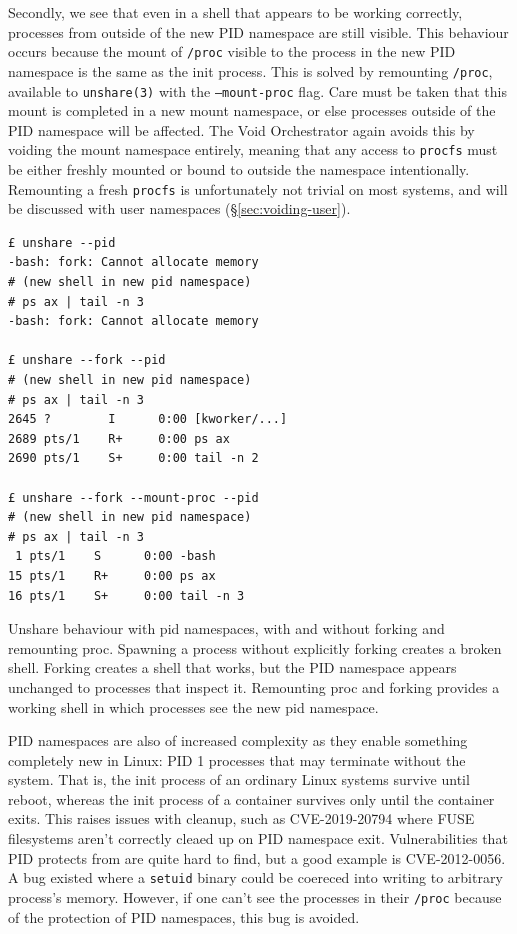 \documentclass[12pt,a4paper,twoside]{report}
\begin{document}
Secondly, we see that even in a shell that appears to be working correctly, processes from outside of the new PID namespace are still visible. This behaviour occurs because the mount of \texttt{/proc} visible to the process in the new PID namespace is the same as the init process. This is solved by remounting \texttt{/proc}, available to \texttt{unshare(3)} with the \texttt{---mount-proc} flag. Care must be taken that this mount is completed in a new mount namespace, or else processes outside of the PID namespace will be affected. The Void Orchestrator again avoids this by voiding the mount namespace entirely, meaning that any access to \texttt{procfs} must be either freshly mounted or bound to outside the namespace intentionally. Remounting a fresh \texttt{procfs} is unfortunately not trivial on most systems, and will be discussed with user namespaces (§\ref{sec:voiding-user}).

\begin{listing}
\begin{verbatim}
£ unshare --pid
-bash: fork: Cannot allocate memory
# (new shell in new pid namespace)
# ps ax | tail -n 3
-bash: fork: Cannot allocate memory

£ unshare --fork --pid
# (new shell in new pid namespace)
# ps ax | tail -n 3
2645 ?        I      0:00 [kworker/...]
2689 pts/1    R+     0:00 ps ax
2690 pts/1    S+     0:00 tail -n 2

£ unshare --fork --mount-proc --pid
# (new shell in new pid namespace)
# ps ax | tail -n 3
 1 pts/1    S      0:00 -bash
15 pts/1    R+     0:00 ps ax
16 pts/1    S+     0:00 tail -n 3
\end{verbatim}

\caption{Unshare behaviour with pid namespaces, with and without forking and remounting proc. Spawning a process without explicitly forking creates a broken shell. Forking creates a shell that works, but the PID namespace appears unchanged to processes that inspect it. Remounting proc and forking provides a working shell in which processes see the new pid namespace.}
\label{lst:unshare-pid}
\end{listing}

PID namespaces are also of increased complexity as they enable something completely new in Linux: PID 1 processes that may terminate without the system. That is, the init process of an ordinary Linux systems survive until reboot, whereas the init process of a container survives only until the container exits. This raises issues with cleanup, such as CVE-2019-20794 where FUSE filesystems aren't correctly cleaed up on PID namespace exit. Vulnerabilities that PID protects from are quite hard to find, but a good example is CVE-2012-0056. A bug existed where a \texttt{setuid} binary could be coereced into writing to arbitrary process's memory. However, if one can't see the processes in their \texttt{/proc} because of the protection of PID namespaces, this bug is avoided.
\end{document}
